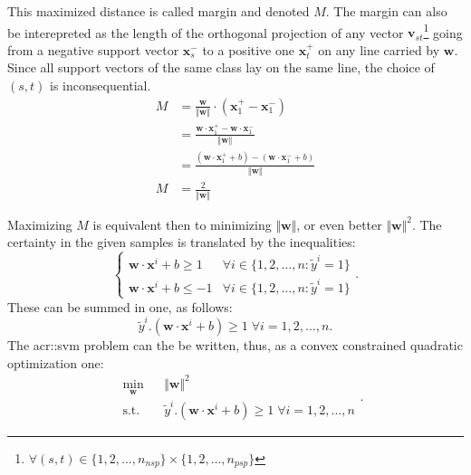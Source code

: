                 This maximized distance is called margin and denoted $M$.
                The margin can also be interepreted as the length of the orthogonal projection of any vector $\bm{v}_{st}$\footnote{$\forall (s, t) \in \{1,2,\dots,n_{nsp}\} \times \{1,2,\dots,n_{psp}\}$} going from a negative support vector $\bm{x}^-_s$ to a positive one $\bm{x}^+_t$ on any line carried by $\bm{w}$.
                Since all support vectors of the same class lay on the same line, the choice of $(s,t)$ is inconsequential.
                \begin{align}
                    M &= \frac{\bm{w}}{\Vert\bm{w}\Vert} \cdot (\bm{x}^+_1 - \bm{x}^-_1) \nonumber \\
                    &= \frac{\bm{w}\cdot\bm{x}^+_1 - \bm{w}\cdot\bm{x}^-_1}{\Vert\bm{w}\Vert} \nonumber \\
                    &= \frac{(\bm{w}\cdot\bm{x}^+_1 + b) - (\bm{w}\cdot\bm{x}^-_1 + b)}{\Vert\bm{w}\Vert} \nonumber \\
                    M &= \frac{2}{\Vert\bm{w}\Vert}
                \end{align}

                Maximizing $M$ is equivalent then to minimizing $\Vert\bm{w}\Vert$, or even better $\Vert\bm{w}\Vert^2$.
                The certainty in the given samples is translated by the inequalities:
                \begin{equation*}
                    \begin{cases}
                        \bm{w}\cdot\bm{x}^i + b \geq 1 & \forall i \in \{1, 2, \dots, n: \tilde{y}^i = 1\}\\
                        \bm{w}\cdot\bm{x}^i + b \leq -1 & \forall i \in \{1, 2, \dots, n: \tilde{y}^i = 1\}
                    \end{cases}.
                \end{equation*}
                These can be summed in one, as follows:
                \begin{equation}
                    \label{eq::hard_margin}
                    \tilde{y}^i.(\bm{w}\cdot\bm{x}^i + b) \geq 1 \; \forall i = 1, 2, \dots, n.
                \end{equation}
                The \gls{acr::svm} problem can the be written, thus, as a convex constrained quadratic optimization one:
                \begin{equation}
                    \label{eq::hard_svm_primal}
                    \begin{aligned}
                        & \min_{\bm{w}}
                        & & {\Vert \bm{w} \Vert}^2 \\
                        & \text{s.t.}
                        & & \tilde{y}^i.(\bm{w}\cdot\bm{x}^i + b) \geq 1 \; \forall i = 1, 2, \dots, n
                    \end{aligned}.
                \end{equation}

